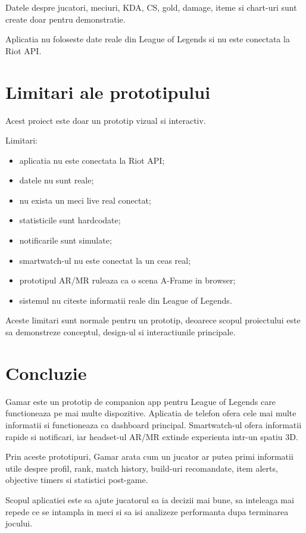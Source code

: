 \documentclass[12pt,a4paper]{article}
\begin{document}
Datele despre jucatori, meciuri, KDA, CS, gold, damage, iteme si chart-uri sunt create doar pentru demonstratie.

Aplicatia nu foloseste date reale din League of Legends si nu este conectata la Riot API.

\section{Limitari ale prototipului}

Acest proiect este doar un prototip vizual si interactiv.

Limitari:

\begin{itemize}
    \item aplicatia nu este conectata la Riot API;
    \item datele nu sunt reale;
    \item nu exista un meci live real conectat;
    \item statisticile sunt hardcodate;
    \item notificarile sunt simulate;
    \item smartwatch-ul nu este conectat la un ceas real;
    \item prototipul AR/MR ruleaza ca o scena A-Frame in browser;
    \item sistemul nu citeste informatii reale din League of Legends.
\end{itemize}

Aceste limitari sunt normale pentru un prototip, deoarece scopul proiectului este sa demonstreze conceptul, design-ul si interactiunile principale.

\section{Concluzie}

Gamar este un prototip de companion app pentru League of Legends care functioneaza pe mai multe dispozitive. Aplicatia de telefon ofera cele mai multe informatii si functioneaza ca dashboard principal. Smartwatch-ul ofera informatii rapide si notificari, iar headset-ul AR/MR extinde experienta intr-un spatiu 3D.

Prin aceste prototipuri, Gamar arata cum un jucator ar putea primi informatii utile despre profil, rank, match history, build-uri recomandate, item alerts, objective timers si statistici post-game.

Scopul aplicatiei este sa ajute jucatorul sa ia decizii mai bune, sa inteleaga mai repede ce se intampla in meci si sa isi analizeze performanta dupa terminarea jocului.
\end{document}
